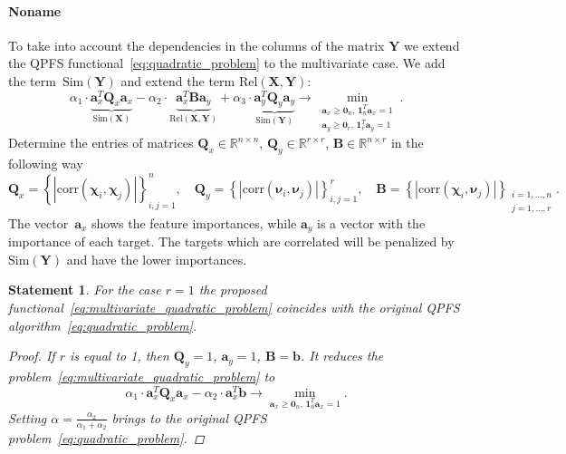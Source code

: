 \documentclass[12pt,twoside]{article}
\newtheorem{statement}{Statement}
\newcommand{\ba}{\mathbf{a}}
\newcommand{\bb}{\mathbf{b}}
\newcommand{\bY}{\mathbf{Y}}
\newcommand{\bX}{\mathbf{X}}
\newcommand{\bB}{\mathbf{B}}
\newcommand{\bQ}{\mathbf{Q}}
\newcommand{\bbR}{\mathbb{R}}
\newcommand{\bchi}{\boldsymbol{\chi}}
\newcommand{\bnu}{\boldsymbol{\nu}}
\newcommand{\bOne}{\boldsymbol{1}}
\newcommand{\bZero}{\boldsymbol{0}}
\begin{document}
\paragraph{Noname}

To take into account the dependencies in the columns of the matrix $\bY$ we extend the QPFS functional~\eqref{eq:quadratic_problem} to the multivariate case. 
We add the term~$\text{Sim}(\bY)$ and extend the term $\text{Rel}(\bX, \bY)$:
\begin{equation}
	\alpha_1 \cdot \underbrace{\ba_x^T \bQ_x \ba_x}_{\text{Sim}(\bX)} - \alpha_2 \cdot \underbrace{\ba_x^T \bB \ba_y}_{\text{Rel}(\bX, \bY)} + \alpha_3 \cdot \underbrace{\ba_y^T \bQ_y \ba_y}_{\text{Sim}(\bY)} \rightarrow \min_{\substack{\ba_x \geq \bZero_n, \, \bOne_n^T\ba_x=1 \\ \ba_y \geq \bZero_r, \, \bOne_r^T\ba_y=1}}.
	\label{eq:multivariate_quadratic_problem}
\end{equation}
Determine the entries of matrices $\bQ_x \in \bbR^{n \times n}$, $\bQ_y \in \bbR^{r \times r}$, $\bB \in \bbR^{n \times r}$ in the following way
\begin{equation*}
	\bQ_x = \left\{ \left| \text{corr}(\bchi_i, \bchi_j) \right| \right\}_{i,j=1}^n, \quad 
	\bQ_y = \left\{ \left| \text{corr}(\bnu_i, \bnu_j) \right| \right\}_{i,j=1}^r, \quad
	\bB =  \left\{ \left| \text{corr}(\bchi_i, \bnu_j) \right| \right\}_{\substack{i=1, \dots, n \\ j=1, \dots, r}}.
\end{equation*}
The vector~$\ba_x$ shows the feature importances, while $\ba_y$ is a vector with the importance of each target. 
The targets which are correlated will be penalized by $\text{Sim} (\bY)$ and have the lower importances.  

\begin{statement}
For the case $r=1$ the proposed functional~\eqref{eq:multivariate_quadratic_problem} coincides with the original QPFS algorithm~\eqref{eq:quadratic_problem}.

\begin{proof}
	If $r$ is equal to 1, then $\bQ_y = 1$, $\ba_y = 1$, $\bB = \bb$. It reduces the problem~\eqref{eq:multivariate_quadratic_problem} to 
	\[
	\alpha_1 \cdot \ba_x^T \bQ_x \ba_x - \alpha_2 \cdot \ba_x^T \bb \rightarrow \min_{\ba_x \geq \bZero_n, \, \bOne_n^T\ba_x=1} .
	\]
	Setting $\alpha = \frac{\alpha_2}{\alpha_1 + \alpha_2}$ brings to the original QPFS problem~\eqref{eq:quadratic_problem}.
\end{proof}
\end{statement}
\end{document}
